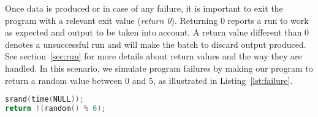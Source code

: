Once data is produced or in case of any failure, it is important to exit the program with a relevant exit value (\emph{return 0}). Returning 0 reports a run to work as expected and output to be taken into account. A return value different than 0 denotes a unsuccessful run and will make the batch to discard output produced. See section~\ref{sec:run} for more details about return values and the way they are handled. In this scenario, we simulate program failures by making our program to return a random value between 0 and 5, as illustrated in Listing~\ref{lst:failure}.

\begin{lstlisting}[caption={Random return value to simulate program failures.},label={lst:failure},language=C]
srand(time(NULL));
return !(random() % 6);
\end{lstlisting}


